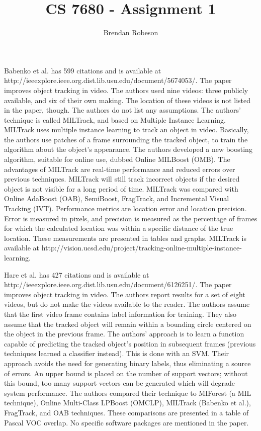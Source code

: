 \documentclass[11pt]{article}
\begin{document}
\title{CS 7680 - Assignment 1}
\author{Brendan Robeson}
\maketitle

Babenko et al. \cite{5674053} has 599 citations and is available at \\
http://ieeexplore.ieee.org.dist.lib.usu.edu/document/5674053/. The paper
improves object tracking in video. The authors used nine videos: three publicly
available, and six of their own making. The location of these videos is not
listed in the paper, though. The authors do not list any assumptions. The
authors' technique is called MILTrack, and based on Multiple Instance Learning.
MILTrack uses multiple instance learning to track an object in video. Basically,
the authors use patches of a frame surrounding the tracked object, to train the
algorithm about the object's appearance. The authors developed a new boosting
algorithm, suitable for online use, dubbed Online MILBoost (OMB). The advantages
of MILTrack are real-time performance and reduced errors over previous
techniques. MILTrack will still track incorrect objects if the desired object is
not visible for a long period of time. MILTrack was compared with Online
AdaBoost (OAB), SemiBoost, FragTrack, and Incremental Visual Tracking (IVT).
Performance metrics are location error and location precision. Error is measured
in pixels, and precision is measured as the percentage of frames for which the
calculated location was within a specific distance of the true location. These
measurements are presented in tables and graphs. MILTrack is available at
http://vision.ucsd.edu/project/tracking-online-multiple-instance-learning.

Hare et al. \cite{6126251} has 427 citations and is available at \\
http://ieeexplore.ieee.org.dist.lib.usu.edu/document/6126251/. The paper
improves object tracking in video. The authors report results for a set of eight
videos, but do not make the videos available to the reader. The authors assume
that the first video frame contains label information for training. They also
assume that the tracked object will remain within a bounding circle centered on
the object in the previous frame. The authors' approach is to learn a function
capable of predicting the tracked object's position in subsequent frames
(previous techniques learned a classifier instead). This is done with an SVM.
Their approach avoids the need for generating binary labels, thus eliminating a
source of errors. An upper bound is placed on the number of support vectors;
without this bound, too many support vectors can be generated which will degrade
system performance. The authors compared their technique to MIForest (a MIL
technique), Online Multi-Class LPBoost (OMCLP), MILTrack (Babenko et al.),
FragTrack, and OAB techniques. These comparisons are presented in a table of
Pascal VOC overlap. No specific software packages are mentioned in the paper.
\end{document}
